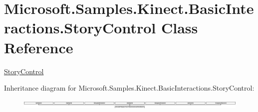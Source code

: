 \hypertarget{class_microsoft_1_1_samples_1_1_kinect_1_1_basic_interactions_1_1_story_control}{\section{Microsoft.\-Samples.\-Kinect.\-Basic\-Interactions.\-Story\-Control Class Reference}
\label{class_microsoft_1_1_samples_1_1_kinect_1_1_basic_interactions_1_1_story_control}
}


\hyperlink{class_microsoft_1_1_samples_1_1_kinect_1_1_basic_interactions_1_1_story_control}{Story\-Control}  


Inheritance diagram for Microsoft.\-Samples.\-Kinect.\-Basic\-Interactions.\-Story\-Control\-:\begin{figure}[H]
\begin{center}
\leavevmode
\includegraphics[height=0.473373cm]{class_microsoft_1_1_samples_1_1_kinect_1_1_basic_interactions_1_1_story_control}
\end{center}
\end{figure}
